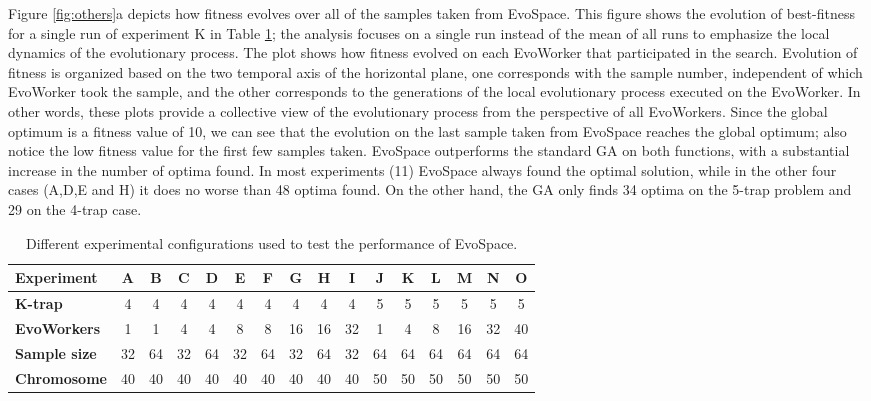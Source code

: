 Figure \ref{fig:others}a depicts how fitness evolves over all of the samples taken from EvoSpace.
This figure shows the evolution of best-fitness for a single run of experiment K in Table \ref{tab:exp};
the analysis focuses on a single run instead of the mean of all runs to emphasize the local dynamics of the evolutionary process.
The plot shows how fitness evolved on each EvoWorker that participated in the search.
Evolution of fitness is organized based on the two temporal axis of the horizontal plane,
one corresponds with the sample number, independent of which EvoWorker took the sample, and the other corresponds
to the generations of the local evolutionary process executed on the EvoWorker.
In other words, these plots provide a collective view of the evolutionary process from the perspective of all EvoWorkers.
Since the global optimum is a fitness value of 10, we can see that the evolution on the last sample taken from EvoSpace reaches the global optimum;
also notice the low fitness value for the first few samples taken.
EvoSpace outperforms the standard GA on both functions, with a substantial increase in the number of optima found.
In most experiments (11) EvoSpace always found the optimal solution, while in the other four cases (A,D,E and H) it does no worse than
48 optima found.
On the other hand, the GA only finds 34 optima on the 5-trap problem and 29 on the 4-trap case.

\begin{table}[t]
\caption{Different experimental configurations used to test the
  performance of EvoSpace.} %
\centering
\scriptsize
\begin{tabular}{|l||c|c|c|c|c|c|c|c|c|c|c|c|c|c|c|}
   \hline
             \textbf{Experiment} 	& A & B & C & D & E & F & G & H & I & J & K & L & M & N & O \\

   \hline
               \textbf{K-trap}   	& 4  & 4  & 4  & 4  & 4  & 4  & 4  & 4  & 4 & 5 & 5 & 5 & 5 & 5 & 5 \\
			   \textbf{EvoWorkers}  & 1  & 1  & 4  & 4  & 8  & 8  & 16 & 16 & 32 & 1 & 4 & 8 & 16 & 32 & 40 \\
			   \textbf{Sample size} & 32 & 64 & 32 & 64 & 32 & 64 & 32 & 64 & 32 & 64 & 64 & 64 & 64 & 64 & 64 \\
			   \textbf{Chromosome} & 40 & 40 & 40 & 40 & 40 & 40 & 40 & 40 & 40 & 50 & 50 & 50 & 50 & 50 & 50 \\
   \hline
\end{tabular}
\label{tab:exp}
\end{table}


